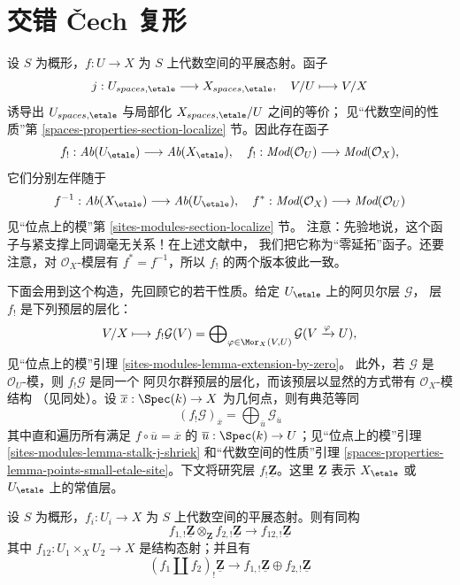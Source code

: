 \section{交错 {\v C}ech 复形}
\label{section-alternating-cech}

\noindent
设 $S$ 为概形，$f : U \to X$ 为 $S$ 上代数空间的平展态射。函子
$$
j : U_{spaces, \etale} \longrightarrow X_{spaces, \etale},\quad
V/U \longmapsto V/X
$$
诱导出 $U_{spaces, \etale}$ 与局部化 $X_{spaces, \etale}/U$ 之间的等价；
见“代数空间的性质”第 \ref{spaces-properties-section-localize} 节。因此存在函子
$$
f_! : \textit{Ab}(U_\etale) \longrightarrow
\textit{Ab}(X_\etale),\quad
f_! : \textit{Mod}(\mathcal{O}_U) \longrightarrow \textit{Mod}(\mathcal{O}_X),
$$
它们分别左伴随于
$$
f^{-1} : \textit{Ab}(X_\etale) \longrightarrow
\textit{Ab}(U_\etale),\quad
f^* : \textit{Mod}(\mathcal{O}_X) \longrightarrow \textit{Mod}(\mathcal{O}_U)
$$
见“位点上的模”第 \ref{sites-modules-section-localize} 节。
注意：先验地说，这个函子与紧支撑上同调毫无关系！在上述文献中，
我们把它称为“零延拓”函子。还要注意，对 $\mathcal{O}_X$-模层有
$f^* = f^{-1}$，所以 $f_!$ 的两个版本彼此一致。

\medskip\noindent
下面会用到这个构造，先回顾它的若干性质。给定 $U_\etale$ 上的阿贝尔层
$\mathcal{G}$，
层 $f_!$ 是下列预层的层化：
$$
V/X \longmapsto
f_!\mathcal{G}(V) =
\bigoplus\nolimits_{\varphi \in \Mor_X(V, U)}
\mathcal{G}(V \xrightarrow{\varphi} U),
$$
见“位点上的模”引理 \ref{sites-modules-lemma-extension-by-zero}。
此外，若 $\mathcal{G}$ 是 $\mathcal{O}_U$-模，则 $f_!\mathcal{G}$ 是同一个
阿贝尔群预层的层化，而该预层以显然的方式带有 $\mathcal{O}_X$-模结构
（见同处）。设 $\overline{x} : \Spec(k) \to X$ 为几何点，则有典范等同
$$
(f_!\mathcal{G})_{\overline{x}} =
\bigoplus\nolimits_{\overline{u}} \mathcal{G}_{\overline{u}}
$$
其中直和遍历所有满足 $f \circ \overline{u} = \overline{x}$ 的
$\overline{u} : \Spec(k) \to U$；见“位点上的模”引理
\ref{sites-modules-lemma-stalk-j-shriek} 和“代数空间的性质”引理
\ref{spaces-properties-lemma-points-small-etale-site}。下文将研究层
$f_!\underline{\mathbf{Z}}$。这里 $\underline{\mathbf{Z}}$ 表示
$X_\etale$ 或 $U_\etale$ 上的常值层。

\begin{lemma}
\label{lemma-product-is-tensor-product}
设 $S$ 为概形，$f_i : U_i \to X$ 为 $S$ 上代数空间的平展态射。则有同构
$$
f_{1, !}\underline{\mathbf{Z}} \otimes_{\mathbf{Z}}
f_{2, !}\underline{\mathbf{Z}}
\longrightarrow
f_{12, !}\underline{\mathbf{Z}}
$$
其中 $f_{12} : U_1 \times_X U_2 \to X$ 是结构态射；并且有
$$
(f_1 \amalg f_2)_! \underline{\mathbf{Z}}
\longrightarrow
f_{1, !}\underline{\mathbf{Z}} \oplus
f_{2, !}\underline{\mathbf{Z}}
$$
\end{lemma}


